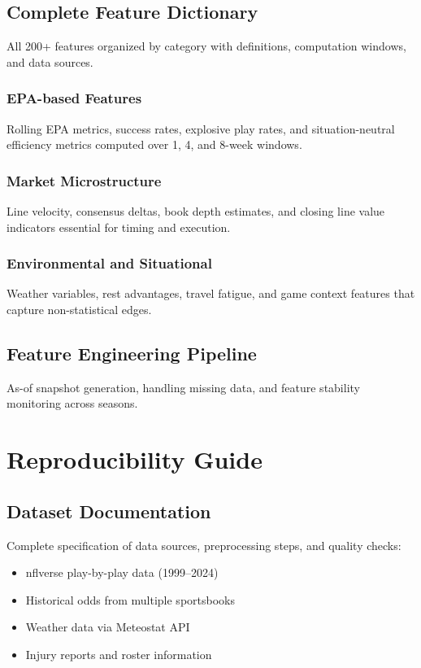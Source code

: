 \documentclass[12pt,letterpaper]{report}
\theoremstyle{definition}
\begin{document}
\section{Complete Feature Dictionary}
All 200+ features organized by category with definitions, computation windows, and data sources.

\subsection{EPA-based Features}
Rolling EPA metrics, success rates, explosive play rates, and situation-neutral efficiency metrics computed over 1, 4, and 8-week windows.

\subsection{Market Microstructure}
Line velocity, consensus deltas, book depth estimates, and closing line value indicators essential for timing and execution.

\subsection{Environmental and Situational}
Weather variables, rest advantages, travel fatigue, and game context features that capture non-statistical edges.

\section{Feature Engineering Pipeline}
As-of snapshot generation, handling missing data, and feature stability monitoring across seasons.

\chapter{Reproducibility Guide}

\section{Dataset Documentation}
Complete specification of data sources, preprocessing steps, and quality checks:
\begin{itemize}
  \item nflverse play-by-play data (1999--2024)
  \item Historical odds from multiple sportsbooks
  \item Weather data via Meteostat API
  \item Injury reports and roster information
\end{itemize}
\end{document}
